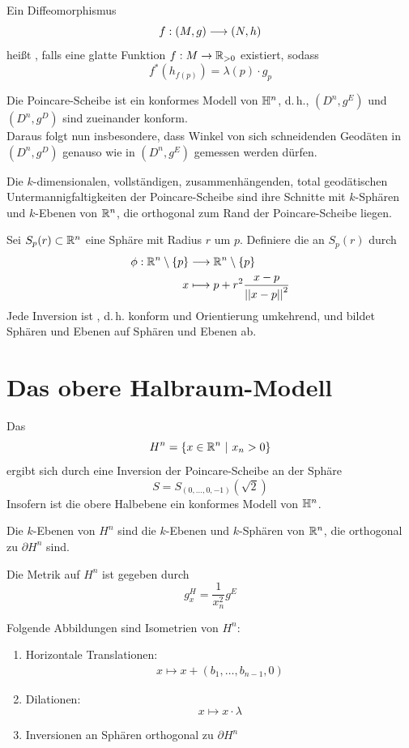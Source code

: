 \documentclass{book}
\begin{document}
\Def{}
Ein Diffeomorphismus
\[ f : (M,g) \overset{}{\longrightarrow} (N,h) \] 
heißt , falls eine glatte Funktion $f : M \overset{}{\rightarrow} \mathbb{R}_{>0}$ existiert, sodass
\[ f^*(h_{f(p)}) = \lambda(p)\cdot g_p  \]

\Bem{}
Die Poincare-Scheibe ist ein konformes Modell von $\mathbb{H}^n$, d.\,h., $(D^n, g^E)$ und $(D^n, g^D)$ sind zueinander konform.\\
Daraus folgt nun insbesondere, dass Winkel von sich schneidenden Geodäten in $(D^n, g^D)$ genauso wie in $(D^n, g^E)$ gemessen werden dürfen.

\Lem{}
Die $k$-dimensionalen, vollständigen, zusammenhängenden, total geodätischen Untermannigfaltigkeiten der Poincare-Scheibe sind ihre Schnitte mit $k$-Sphären und $k$-Ebenen von $\mathbb{R}^n$, die orthogonal zum Rand der Poincare-Scheibe liegen.

\Def{}
Sei $S_{p}(r) \subset \mathbb{R}^n$ eine Sphäre mit Radius $r$ um $p$. Definiere die  an $S_p(r)$ durch
\begin{align*}
\phi : \mathbb{R}^n\setminus\{p\} & \overset{}{\longrightarrow} \mathbb{R}^n\setminus\{p\}\\
x & \longmapsto p + r^2\frac{x- p}{\left|\left|x-p\right|\right|^2}
\end{align*}
\Prop{}
Jede Inversion ist , d.\,h. konform und Orientierung umkehrend, und bildet Sphären und Ebenen auf Sphären und Ebenen ab.

\section{Das obere Halbraum-Modell}
\Def{}
Das 
\[ H^n = \set{x \in \R^{n}}{x_n > 0} \]
ergibt sich durch eine Inversion der Poincare-Scheibe an der Sphäre
\[ S = S_{(0,\ldots,0,-1)}(\sqrt{2}) \]
Insofern ist die obere Halbebene ein konformes Modell von $\mathbb{H}^n$.

\Prop{}
Die $k$-Ebenen von $H^n$ sind die $k$-Ebenen und $k$-Sphären von $\mathbb{R}^n$, die orthogonal zu $\partial H^n$ sind.

\Prop{}
Die Metrik auf $H^n$ ist gegeben durch
\[ g_x^H =  \frac{1}{x_n^2} g^E \]


\Prop{}
Folgende Abbildungen sind Isometrien von $H^n$:
\begin{enumerate}[1.)]
\item Horizontale Translationen:
\begin{align*}
x \longmapsto x + (b_1,\ldots, b_{n-1}, 0)
\end{align*}
\item Dilationen:
\[ x \longmapsto x \cdot \lambda \]
\item Inversionen an Sphären orthogonal zu $\partial H^n$
\end{enumerate}
\end{document}
